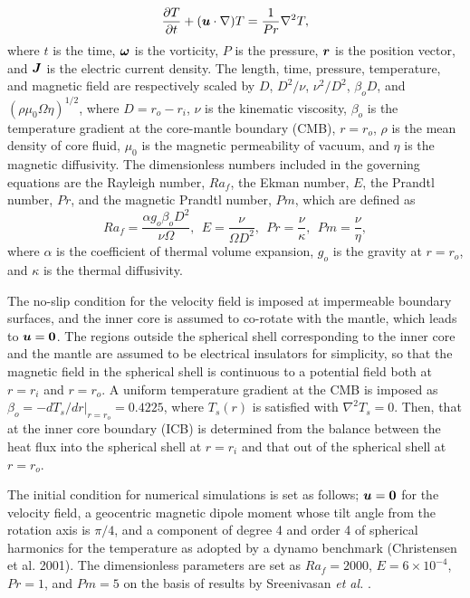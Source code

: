 %
\begin{equation}
\frac{\partial T}{\partial t} 
 + ( \mbox{\boldmath$u$} \cdot \nabla ) T =
 \frac{1}{Pr} \nabla^2 T ,
\label{eq:heat}
\end{equation}
%
where $t$ is the time, $\mbox{\boldmath$\omega$}$ is the vorticity, $P$ is the pressure, $\mbox{\boldmath$r$}$ is the position vector, and $\mbox{\boldmath$J$}$ is the electric current density.
The length, time, pressure, temperature, and magnetic field are respectively scaled by $D$, $D^2/\nu$, $\nu^2 /D^2$, $\beta_o D$, and $(\rho \mu_0 \Omega \eta )^{1/2}$, where $D = r_o - r_i$, $\nu$ is the kinematic viscosity, $\beta_o$ is the temperature gradient at the core-mantle boundary (CMB), $r = r_o$, $\rho$ is the mean density of core fluid, $\mu_0$ is the magnetic permeability of vacuum, and $\eta$ is the magnetic diffusivity.
The dimensionless numbers included in the governing equations are the Rayleigh number, $Ra_f$, the Ekman number, $E$, the Prandtl number, $Pr$, and the magnetic Prandtl number, $Pm$, which are defined as
%
\begin{equation}
Ra_f = \frac{\alpha g_o \beta_o D^2}{\nu \Omega},~~
E = \frac{\nu}{\Omega D^2},~~
Pr = \frac{\nu}{\kappa},~~
Pm = \frac{\nu}{\eta},
\label{eq:dimensionless_numbers}
\end{equation}
%
where $\alpha$ is the coefficient of thermal volume expansion, $g_o$ is the gravity at $r = r_o$, and $\kappa$ is the thermal diffusivity.

The no-slip condition for the velocity field is imposed at impermeable boundary surfaces, and the inner core is assumed to co-rotate with the mantle, which leads to $\mbox{\boldmath$u$} = {\bf 0}$.
The regions outside the spherical shell corresponding to the inner core and the mantle are assumed to be electrical insulators for simplicity, so that the magnetic field in the spherical shell is continuous to a potential field both at $r = r_i$ and $r = r_o$.
A uniform temperature gradient at the CMB is imposed as $\beta_o = -d T_s / dr |_{r = r_o} = 0.4225$, where $T_s (r)$ is satisfied with $\nabla^2 T_s = 0$.
Then, that at the inner core boundary (ICB) is determined from the balance between the heat flux into the spherical shell at $r = r_i$ and that out of the spherical shell at $r = r_o$.

The initial condition for numerical simulations is set as follows; $\mbox{\boldmath$u$} = {\bf 0}$ for the velocity field, a geocentric magnetic dipole moment whose tilt angle from the rotation axis is $\pi / 4$, and a component of degree 4 and order 4 of spherical harmonics for the temperature as adopted by a dynamo benchmark (Christensen et al. 2001).
The dimensionless parameters are set as $Ra_f = 2000$, $E = 6 \times 10^{-4}$, $Pr = 1$, and $Pm = 5$ on the basis of results by Sreenivasan {\it et al.} .

